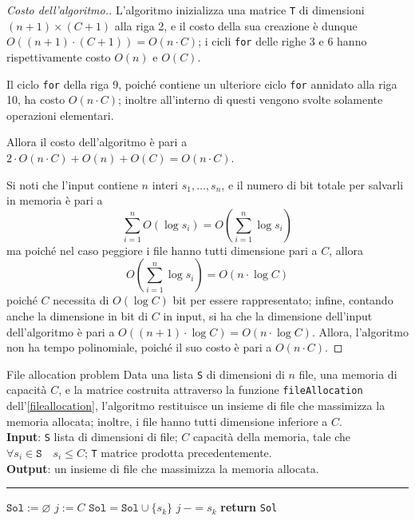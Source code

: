 \documentclass[a4paper, 12pt]{report}
\begin{document}
    \begin{proof}[Costo dell'algoritmo.]
        L'algoritmo inizializza una matrice \texttt{T} di dimensioni $(n + 1) \times (C + 1)$ alla riga 2, e il costo della sua creazione è dunque $O((n + 1) \cdot (C + 1)) = O(n \cdot C)$; i cicli \texttt{for} delle righe 3 e 6 hanno rispettivamente costo $O(n)$ e $O(C)$.

        Il ciclo \texttt{for} della riga 9, poiché contiene un ulteriore ciclo \texttt{for} annidato alla riga 10, ha costo $O(n \cdot C)$; inoltre all'interno di questi vengono svolte solamente operazioni elementari.

        Allora il costo dell'algoritmo è pari a $2 \cdot O(n \cdot C) + O(n) + O(C) = O(n \cdot C)$.

        Si noti che l'input contiene $n$ interi $s_1, \ldots, s_n$, e il numero di bit totale per salvarli in memoria è pari a $$\displaystyle \sum_{i = 1}^n{O(\log s_i)} = O \left ( \sum_{i = 1}^n{\log s_i} \right )$$ ma poiché nel caso peggiore i file hanno tutti dimensione pari a $C$, allora $$O \left ( \sum_{i = 1}^n{\log s_i} \right ) = O(n \cdot \log C)$$ poiché $C$ necessita di $O(\log C)$ bit per essere rappresentato; infine, contando anche la dimensione in bit di $C$ in input, si ha che la dimensione dell'input dell'algoritmo è pari a $O((n + 1) \cdot \log C) = O(n \cdot \log C)$. Allora, l'algoritmo non ha tempo polinomiale, poiché il suo costo è pari a $O(n \cdot C)$.
    \end{proof}

    \begin{framedalgo}[label={fileallocation2}]{File allocation problem}
        Data una lista \texttt{S} di dimensioni di $n$ file, una memoria di capacità $C$, e la matrice costruita attraverso la funzione \texttt{fileAllocation} dell'\cref{fileallocation}, l'algoritmo restituisce un insieme di file che massimizza la memoria allocata; inoltre, i file hanno tutti dimensione inferiore a $C$.\\
        \textbf{Input}: \texttt{S} lista di dimensioni di file; $C$ capacità della memoria, tale che $\forall s_i \in \texttt{S} \quad s_i \le C$; \texttt{T} matrice prodotta precedentemente.\\
        \textbf{Output}: un insieme di file che massimizza la memoria allocata.

        \hrule
        \begin{algorithmic}[1]
                \State $\texttt{Sol} := \varnothing$
                \State $j:= C$
                 
                        \State $\texttt{Sol} = \texttt{Sol} \cup \{s_k\}$
                        \State $j \ -= s_k$
                    \EndIf
                \EndFor
                \State \textbf{return} \texttt{Sol}
            \EndFunction
        \end{algorithmic}
    \end{framedalgo}
\end{document}
